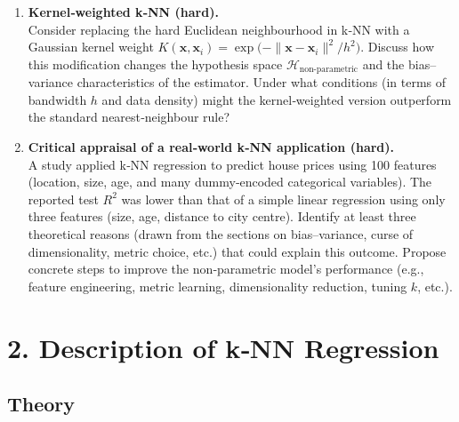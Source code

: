 \documentclass[12pt, a4paper]{article}
\begin{document}
\begin{enumerate}
\item \textbf{Kernel‑weighted k‑NN (hard).}\\
Consider replacing the hard Euclidean neighbourhood in k‑NN with a Gaussian kernel weight 
\(K(\mathbf{x},\mathbf{x}_i)=\exp\!\big(-\|\mathbf{x}-\mathbf{x}_i\|^{2}/h^{2}\big)\).  Discuss how this modification changes the hypothesis space \(\mathcal H_{\text{non‑parametric}}\) and the bias–variance characteristics of the estimator.  Under what conditions (in terms of bandwidth \(h\) and data density) might the kernel‑weighted version outperform the standard nearest‑neighbour rule?

\item \textbf{Critical appraisal of a real‑world k‑NN application (hard).}\\
A study applied k‑NN regression to predict house prices using 100 features (location, size, age, and many dummy‑encoded categorical variables).  The reported test \(R^{2}\) was lower than that of a simple linear regression using only three features (size, age, distance to city centre).  Identify at least three theoretical reasons (drawn from the sections on bias–variance, curse of dimensionality, metric choice, etc.) that could explain this outcome.  Propose concrete steps to improve the non‑parametric model’s performance (e.g., feature engineering, metric learning, dimensionality reduction, tuning \(k\), etc.).
\end{enumerate}

\newpage

\section{2. Description of k‑NN Regression}
\subsection{Theory}
\end{document}
